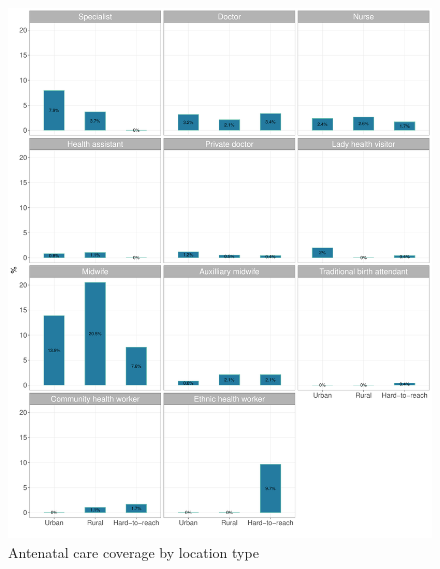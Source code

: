 \documentclass[12pt,a4paper]{article}
\begin{document}
\begin{figure}[H]

{\centering \includegraphics{kayinReport_files/figure-latex/anc1plot-1} 

}

\caption{Antenatal care coverage by location type}\label{fig:anc1plot}
\end{figure}
\end{document}
